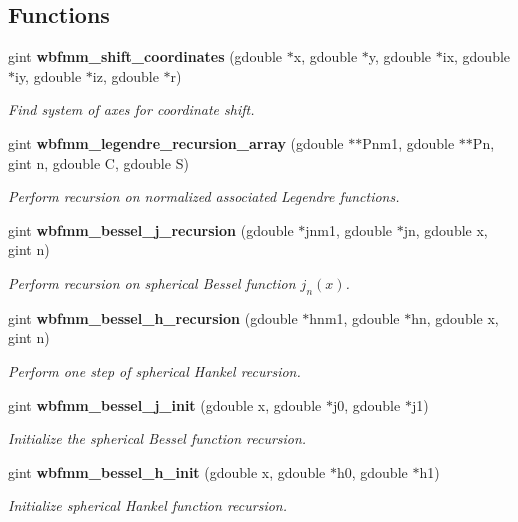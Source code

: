 \subsection*{Functions}
\begin{DoxyCompactItemize}
\item 
gint \textbf{ wbfmm\+\_\+shift\+\_\+coordinates} (gdouble $\ast$x, gdouble $\ast$y, gdouble $\ast$ix, gdouble $\ast$iy, gdouble $\ast$iz, gdouble $\ast$r)
\begin{DoxyCompactList}\small\item\em Find system of axes for coordinate shift. \end{DoxyCompactList}\item 
gint \textbf{ wbfmm\+\_\+legendre\+\_\+recursion\+\_\+array} (gdouble $\ast$$\ast$Pnm1, gdouble $\ast$$\ast$Pn, gint n, gdouble C, gdouble S)
\begin{DoxyCompactList}\small\item\em Perform recursion on normalized associated Legendre functions. \end{DoxyCompactList}\item 
gint \textbf{ wbfmm\+\_\+bessel\+\_\+j\+\_\+recursion} (gdouble $\ast$jnm1, gdouble $\ast$jn, gdouble x, gint n)
\begin{DoxyCompactList}\small\item\em Perform recursion on spherical Bessel function $j_{n}(x)$. \end{DoxyCompactList}\item 
gint \textbf{ wbfmm\+\_\+bessel\+\_\+h\+\_\+recursion} (gdouble $\ast$hnm1, gdouble $\ast$hn, gdouble x, gint n)
\begin{DoxyCompactList}\small\item\em Perform one step of spherical Hankel recursion. \end{DoxyCompactList}\item 
gint \textbf{ wbfmm\+\_\+bessel\+\_\+j\+\_\+init} (gdouble x, gdouble $\ast$j0, gdouble $\ast$j1)
\begin{DoxyCompactList}\small\item\em Initialize the spherical Bessel function recursion. \end{DoxyCompactList}\item 
gint \textbf{ wbfmm\+\_\+bessel\+\_\+h\+\_\+init} (gdouble x, gdouble $\ast$h0, gdouble $\ast$h1)
\begin{DoxyCompactList}\small\item\em Initialize spherical Hankel function recursion. \end{DoxyCompactList}\item 

\end{DoxyCompactItemize}
